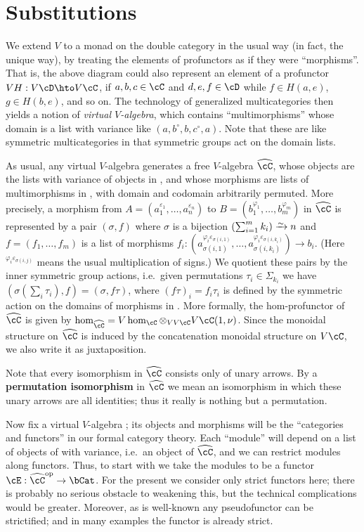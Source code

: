 \documentclass{amsart}
\newcommand{\C}{\cC}
\newcommand{\D}{\cD}
\renewcommand{\Chat}{\ensuremath{\widehat{\C}}\xspace}
\newcommand{\E}{\cE}
\newcommand{\Tmult}{\nu}
\renewcommand{\o}{^{\circ}}
\newcommand{\e}[1][]{^{\varepsilon_{#1}}}
\renewcommand{\ph}[1][]{^{\varphi_{#1}}}
\newcommand{\phe}[2]{^{\varphi_{#1}\varepsilon_{#2}}}
\begin{document}
\section{Substitutions}
\label{sec:substitutions}

We extend $V$ to a monad on the double category \dCat in the usual way (in fact, the unique way), by treating the elements of profunctors as if they were ``morphisms''.
That is, the above diagram could also represent an element of a profunctor $V H : V \D \hto V \C$, if $a,b,c\in\C$ and $d,e,f\in \D$ while $f\in H(a,e)$, $g\in H(b,e)$, and so on.
The technology of generalized multicategories then yields a notion of \emph{virtual $V$-algebra}, which contains ``multimorphisms'' whose domain is a list with variance like $(a,b\o,b,c\o,a)$.
Note that these are like symmetric multicategories in that symmetric groups act on the domain lists.

As usual, any virtual $V$-algebra \C generates a free $V$-algebra \Chat, whose objects are the lists with variance of objects in \C, and whose morphisms are lists of multimorphisms in \C, with domain and codomain arbitrarily permuted.
More precisely, a morphism from $A=(a_1\e[1],\dots,a_n\e[n])$ to $B=(b_1\ph[1],\dots,b_m\ph[m])$ in \Chat is represented by a pair $(\sigma,f)$ where $\sigma$ is a bijection $\left(\sum_{i=1}^m k_i\right) \toiso n$ and $f=(f_1,\dots,f_m)$ is a list of morphisms $f_i:(a_{\sigma(i,1)}\phe{i}{\sigma(i,1)},\dots,a_{\sigma(i,k_i)}\phe{i}{\sigma(i,k_i)}) \to b_i$.
(Here $\phe{i}{\sigma(i,j)}$ means the usual multiplication of signs.)
We quotient these pairs by the inner symmetric group actions, i.e.\ given permutations $\tau_i\in\Sigma_{k_i}$ we have $(\sigma(\sum_i \tau_i), f) = (\sigma,f\tau)$, where $(f\tau)_i = f_i \tau_i$ is defined by the symmetric action on the domains of morphisms in \C.
More formally, the hom-profunctor of \Chat is given by $\hom_{\Chat} = V\hom_\C \otimes_{VV\C} V\C(1,\Tmult)$.
Since the monoidal structure on \Chat is induced by the concatenation monoidal structure on $V\C$, we also write it as juxtaposition.

Note that every isomorphism in \Chat consists only of unary arrows.
By a \textbf{permutation isomorphism} in \Chat we mean an isomorphism in which these unary arrows are all identities; thus it really is nothing but a permutation.

Now fix a virtual $V$-algebra \C; its objects and morphisms will be the ``categories and functors'' in our formal category theory.
Each ``module'' will depend on a list of objects of \C with variance, i.e.\ an object of \Chat, and we can restrict modules along functors.
Thus, to start with we take the modules to be a functor $\E:\Chat\op\to \bCat$.
For the present we consider only strict functors here; there is probably no serious obstacle to weakening this, but the technical complications would be greater.
Moreover, as is well-known any pseudofunctor can be strictified; and in many examples the functor is already strict.
\end{document}
